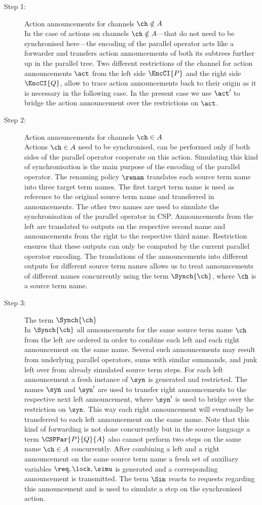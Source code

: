 \documentclass[]{eptcs}
\begin{document}
\begin{description}
	\item[Step 1:] Action announcements for channels $ \ch \notin A $\\
		In the case of actions on channels $ \ch \notin A $---that do not need to be synchronised here---the encoding of the parallel operator acts like a forwarder and transfers action announcements of both its subtrees further up in the parallel tree.
		Two different restrictions of the channel for action announcements $ \act $ from the left side $ \EncCI{P} $ and the right side $ \EncCI{Q} $, allow to trace action announcements back to their origin as it is necessary in the following case.
		In the present case we use $ \act' $ to bridge the action announcement over the restrictions on $ \act $.
	\item[Step 2:] Action announcements for channels $ \ch \in A $\\
		Actions $ \ch \in A $ need to be synchronised, \ie can be performed only if both sides of the parallel operator cooperate on this action. Simulating this kind of synchronisation is the main purpose of the encoding of the parallel operator.
		The renaming policy $ \renam $ translates each source term name into three target term names. The first target term name is used as reference to the original source term name and transferred in announcements. The other two names are used to simulate the synchronisation of the parallel operator in CSP. Announcements from the left are translated to outputs on the respective second name and announcements from the right to the respective third name. Restriction ensures that these outputs can only be computed by the current parallel operator encoding. The translations of the announcements into different outputs for different source term names allows us to treat announcements of different names concurrently using the term $ \Synch{\ch} $, where $ \ch $ is a source term name.
	\item[Step 3:] The term $ \Synch{\ch} $\\
		In $ \Synch{\ch} $ all announcements for the same source term name $ \ch $ from the left are ordered in order to combine each left and each right announcement on the same name. Several such announcements may result from underlying parallel operators, sums with similar summands, and junk left over from already simulated source term steps. For each left announcement a fresh instance of $ \syn $ is generated and restricted. The names $ \syn $ and $ \syn' $ are used to transfer right announcements to the respective next left announcement, where $ \syn' $ is used to bridge over the restriction on $ \syn $. This way each right announcement will eventually be transferred to each left announcement on the same name. Note that this kind of forwarding is not done concurrently but in the source language a term $ \CSPPar{P}{Q}{A} $ also cannot perform two steps on the same name $ \ch \in A $ concurrently. After combining a left and a right announcement on the same source term name a fresh set of auxiliary variables $ \req, \lock, \simu $ is generated and a corresponding announcement is transmitted. The term $ \Sim $ reacts to requests regarding this announcement and is used to simulate a step on the synchronised action.

\end{description}
\end{document}
